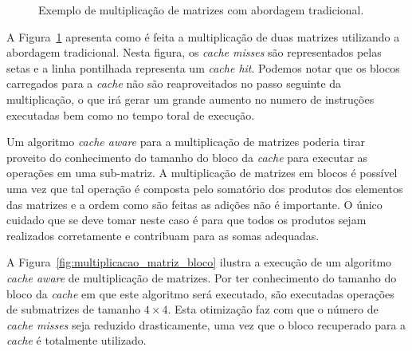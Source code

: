 \begin{figure}[hb]
    \centering
    \caption[Exemplo de multiplicação de matrizes]{Exemplo de multiplicação de matrizes com abordagem tradicional.}
    \label{fig:multiplicacao_matriz}
\end{figure}

A Figura~\ref{fig:multiplicacao_matriz} apresenta como é feita a multiplicação de duas matrizes utilizando a abordagem tradicional. Nesta figura, os \textit{cache misses} são representados pelas setas e a linha pontilhada representa um \textit{cache hit}. Podemos notar que os blocos carregados para a \textit{cache} não são reaproveitados no passo seguinte da multiplicação, o que irá gerar um grande aumento no numero de instruções executadas bem como no tempo toral de execução.

Um algoritmo \textit{cache aware} para a multiplicação de matrizes poderia tirar proveito do conhecimento do tamanho do bloco da \textit{cache} para executar as operações em uma sub-matriz.
A multiplicação de matrizes em blocos é possível uma vez que tal operação é composta pelo somatório dos produtos dos elementos das matrizes e a ordem como são feitas as adições não é importante.
O único cuidado que se deve tomar neste caso é para que todos os produtos sejam realizados corretamente e contribuam para as somas adequadas.



A Figura~\ref{fig:multiplicacao_matriz_bloco} ilustra a execução de um algoritmo \textit{cache aware} de multiplicação de matrizes. Por ter conhecimento do tamanho do bloco da \textit{cache} em que este algoritmo será executado, são executadas operações de submatrizes de tamanho $4 \times 4$. Esta otimização faz com que o número de \textit{cache misses} seja reduzido drasticamente, uma vez que o bloco recuperado para a \textit{cache} é totalmente utilizado.

